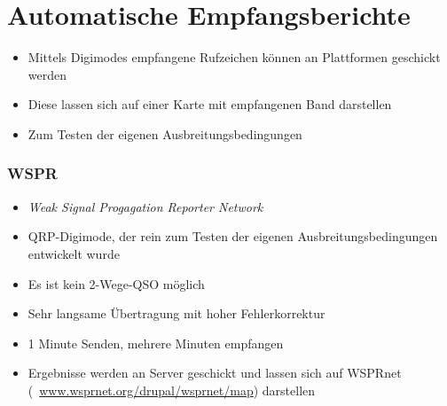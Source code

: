 
\section{Automatische Empfangsberichte}
\label{section:automatische_empfangsberichte}
\begin{frame}%
\begin{itemize}
  \item Mittels Digimodes empfangene Rufzeichen können an Plattformen geschickt werden
  \item Diese lassen sich auf einer Karte mit empfangenen Band darstellen
  \item Zum Testen der eigenen Ausbreitungsbedingungen
  \end{itemize}

\end{frame}

\begin{frame}
\frametitle{WSPR}
\begin{itemize}
  \item \emph{Weak Signal Progagation Reporter Network}
  \item QRP-Digimode, der rein zum Testen der eigenen Ausbreitungsbedingungen entwickelt wurde
  \item Es ist kein 2-Wege-QSO möglich
  \item Sehr langsame Übertragung mit hoher Fehlerkorrektur
  \item 1 Minute Senden, mehrere Minuten empfangen
  \item Ergebnisse werden an Server geschickt und lassen sich auf WSPRnet (\textcolor{DARCblue}{\faLink~\href{https://www.wsprnet.org/drupal/wsprnet/map}{www.wsprnet.org/drupal/wsprnet/map}}) darstellen
  \end{itemize}
\end{frame}

